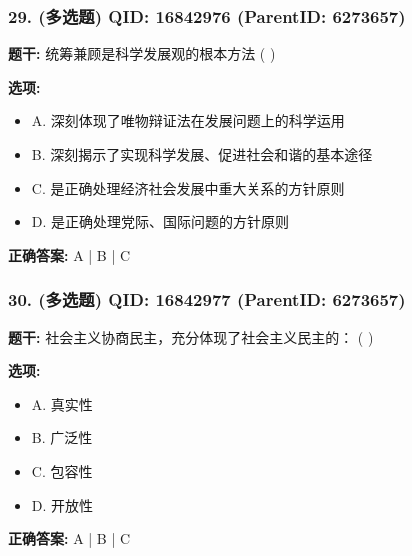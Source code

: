 \documentclass[12pt,UTF8]{ctexart}
\begin{document}
\subsubsection*{29. (多选题) \small QID: 16842976 (ParentID: 6273657)}

\textbf{题干:}
统筹兼顾是科学发展观的根本方法 ( )



\textbf{选项:}
\begin{itemize}[leftmargin=*]

  \item A. 深刻体现了唯物辩证法在发展问题上的科学运用

  \item B. 深刻揭示了实现科学发展、促进社会和谐的基本途径

  \item C. 是正确处理经济社会发展中重大关系的方针原则

  \item D. 是正确处理党际、国际问题的方针原则

\end{itemize}

\textbf{正确答案:}
A | B | C

\vspace{0.3em}\hrulefill\vspace{0.7em}

\subsubsection*{30. (多选题) \small QID: 16842977 (ParentID: 6273657)}

\textbf{题干:}
社会主义协商民主，充分体现了社会主义民主的： ( )



\textbf{选项:}
\begin{itemize}[leftmargin=*]

  \item A. 真实性

  \item B. 广泛性

  \item C. 包容性

  \item D. 开放性

\end{itemize}

\textbf{正确答案:}
A | B | C

\vspace{0.3em}\hrulefill\vspace{0.7em}
\end{document}
